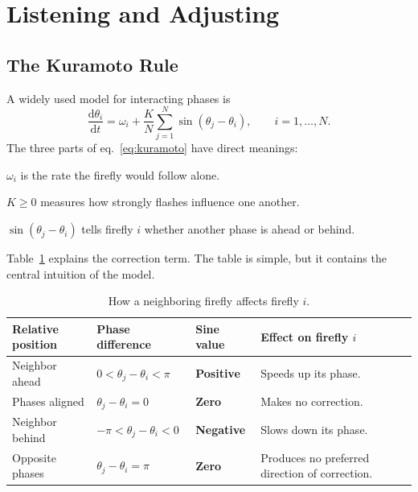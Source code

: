 \documentclass[11pt]{article}
\begin{document}
\section{Listening and Adjusting}

\subsection{The Kuramoto Rule}
A widely used model for interacting phases is
\begin{equation}\label{eq:kuramoto}
    \frac{\mathrm{d}\theta_i}{\mathrm{d}t}
        = \omega_i + \frac{K}{N}\sum_{j=1}^{N}\sin(\theta_j - \theta_i),
        \qquad i = 1,\dots,N.
\end{equation}
The three parts of eq.~\eqref{eq:kuramoto} have direct meanings:
\begin{description}[style=nextline]
    \item[Internal clock] $\omega_i$ is the rate the firefly would follow alone.
    \item[Coupling strength] $K \ge 0$ measures how strongly flashes influence one
          another.
    \item[Timing correction] $\sin(\theta_j - \theta_i)$ tells firefly $i$ whether
          another phase is ahead or behind.
\end{description}

Table~\ref{tab:sine} explains the correction term. The table is simple, but it
contains the central intuition of the model.

\begin{table}[ht]
    \centering
    \caption{How a neighboring firefly affects firefly $i$.}
    \label{tab:sine}
    \begin{tabular}{l l l >{\raggedright\arraybackslash}p{4.3cm}}
        \toprule
        \textbf{Relative position} & \textbf{Phase difference} &
        \textbf{Sine value} & \textbf{Effect on firefly $i$} \\
        \midrule
        \rowcolor{green!10}
        Neighbor ahead  & $0 < \theta_j-\theta_i < \pi$  &
            \textbf{\textcolor{green!55!black}{Positive}} & Speeds up its phase. \\
        \rowcolor{gray!15}
        Phases aligned  & $\theta_j-\theta_i = 0$        &
            \textbf{Zero} & Makes no correction. \\
        \rowcolor{red!10}
        Neighbor behind & $-\pi < \theta_j-\theta_i < 0$ &
            \textbf{\textcolor{red!70!black}{Negative}} & Slows down its phase. \\
        \rowcolor{gray!15}
        Opposite phases & $\theta_j-\theta_i = \pi$      &
            \textbf{Zero} & Produces no preferred direction of correction. \\
        \bottomrule
    \end{tabular}
\end{table}
\end{document}
